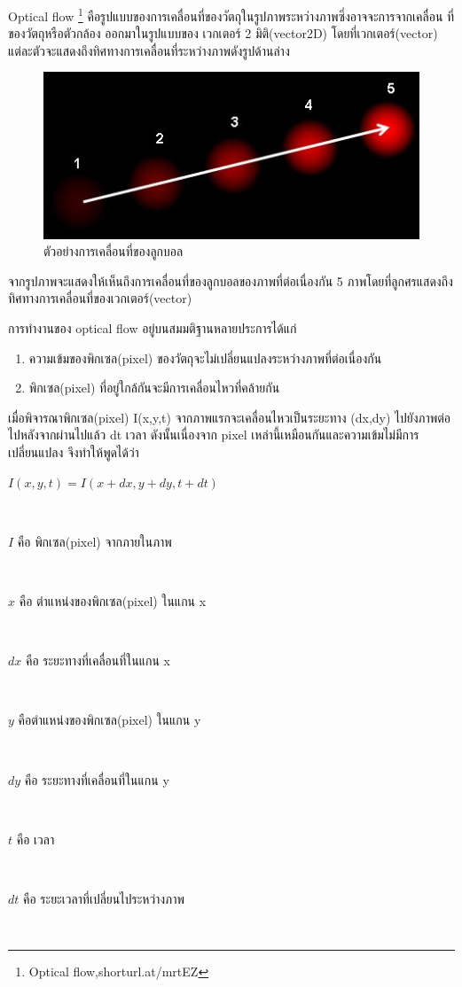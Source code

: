 Optical flow \footnote{Optical flow,shorturl.at/mrtEZ}  คือรูปแบบของการเคลื่อนที่ของวัตถุในรูปภาพระหว่างภาพซึ่งอาจจะการจากเคลื่อน ที่ของวัตถุหรือตัวกล้อง ออกมาในรูปแบบของ เวกเตอร์ 2 มิติ(vector2D) โดยที่เวกเตอร์(vector) แต่ละตัวจะแสดงถึงทิศทางการเคลื่อนที่ระหว่างภาพดังรูปด้านล่าง

\begin{figure}[!ht]
	\centering
	\includegraphics[width=1\textwidth]{chapter2/images/vector_optical.png}
		\caption{ตัวอย่างการเคลื่อนที่ของลูกบอล}
    	\label{fig:vector_optical}
\end{figure}

จากรูปภาพจะแสดงให้เห็นถึงการเคลื่อนที่ของลูกบอลของภาพที่ต่อเนื่องกัน 5 ภาพโดยที่ลูกศรแสดงถึงทิศทางการเคลื่อนที่ของเวกเตอร์(vector)
\\
\par
การทำงานของ optical flow อยู่บนสมมติฐานหลายประการได้แก่
\begin{enumerate}
	\setlength\itemsep{-0.25em}
	\item ความเข้มของพิกเซล(pixel) ของวัตถุจะไม่เปลี่ยนแปลงระหว่างภาพที่ต่อเนื่องกัน
	\item พิกเซล(pixel) ที่อยู่ใกล้กันจะมีการเคลื่อนไหวที่คล้ายกัน
\end{enumerate}

เมื่อพิจารณาพิกเซล(pixel) I(x,y,t) จากภาพแรกจะเคลื่อนไหวเป็นระยะทาง (dx,dy) ไปยังภาพต่อไปหลังจากผ่านไปแล้ว dt เวลา ดังนั้นเนื่องจาก pixel เหล่านี้เหมือนกันและความเข้มไม่มีการเปลี่ยนแปลง จึงทำให้พูดได้ว่า
\\
\centerline{$I(x,y,t) = I(x + dx, y + dy, t + dt)$}		\\
\centerline{$I$ คือ พิกเซล(pixel) จากภายในภาพ}		\\
\centerline{$x$ คือ ตำแหน่งของพิกเซล(pixel) ในแกน x} 	\\
\centerline{$dx$ คือ ระยะทางที่เคลื่อนที่ในแกน x} 		\\
\centerline{$y$ คือตำแหน่งของพิกเซล(pixel) ในแกน y} 	\\
\centerline{$dy$ คือ ระยะทางที่เคลื่อนที่ในแกน y}		\\
\centerline{$t$ คือ เวลา}						\\
\centerline{$dt$ คือ ระยะเวลาที่เปลี่ยนไประหว่างภาพ} 	\\

